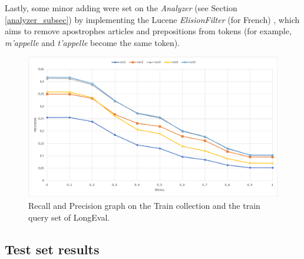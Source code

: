Lastly, some minor adding were set on the \textit{Analyzer} (see Section \ref{analyzer_subsec}) by implementing the Lucene \textit{ElisionFilter} (for French) \cite{luceneelisionfilter}, which aims to remove apostrophes articles and prepositions from tokens (for example, \textit{m'appelle} and \textit{t'appelle} become the same token).
\begin{figure}[h!]
    \includegraphics[width=\textwidth]{figure/PRgraph.png}
    \caption{Recall and Precision graph on the Train collection and the train query set of LongEval.}
    \label{fig:recallPrecision}
\end{figure}

\subsection{Test set results}
\label{subsec:results_submission}


\pagebreak
